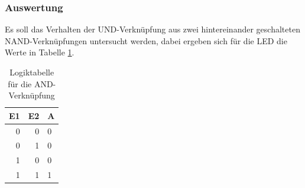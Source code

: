 \documentclass[12pt,a4paper]{article}
\begin{document}
\subsubsection*{Auswertung}

Es soll das Verhalten der UND-Verknüpfung aus zwei hintereinander geschalteten NAND-Verknüpfungen untersucht werden, dabei ergeben sich für die LED die Werte in Tabelle \ref{tab:2_2}.

\begin{table}[H]
\begin{center}
\begin{tabular}{r|r|l}

\multicolumn{1}{l|}{E1} & \multicolumn{1}{l|}{E2} & A \\ \hline \hline
0 & 0 & 0 \\ 
0 & 1 & 0 \\ 
1 & 0 & 0 \\ 
1 & 1 & 1 \\ 
\end{tabular}
\end{center}
\caption{Logiktabelle für die AND-Verknüpfung}
\label{tab:2_2}
\end{table}
\end{document}
